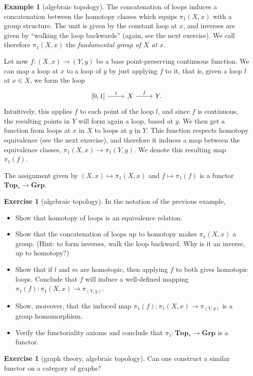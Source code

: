 \documentclass[a4paper,11pt,oneside]{scrbook}
\numberwithin{equation}{section}
\theoremstyle{plain}
\theoremstyle{definition}
\newtheorem{eg}[thm]{Example}
\newtheorem{ex}[thm]{Exercise}
\newcommand{\cat}[1]{{\mathbf{#1}}} %
\newcommand{\ar}[2][]{\arrow{#2}{#1}}
\newcommand{\Grp}{\cat{Grp}}
\DeclareMathOperator{\1}{\mathbbm{1}}
\DeclareMathOperator{\2}{\mathbbm{2}}
\let\originalleft\left
\let\originalright\right
\renewcommand{\left}{\mathopen{}\mathclose\bgroup\originalleft}
\renewcommand{\right}{\aftergroup\egroup\originalright}
\begin{document}
\begin{eg}[algebraic topology]
 The concatenation of loops induces a concatenation between the homotopy classes which equips $\pi_1(X,x)$ with a group structure. The unit is given by the constant loop at $x$, and inverses are given by ``walking the loop backwards'' (again, see the next exercise). We call therefore $\pi_1(X,x)$ the \emph{fundamental group of $X$ at $x$}. 
 
 Let now $f:(X,x)\to(Y,y)$ be a base point-preserving continuous function. We can map a loop at $x$ to a loop of $y$ by just applying $f$ to it, that is, given a loop $l$ at $x\in X$, we form the loop
 $$
 \begin{tikzcd}
  \left[0,1\right] \ar{r}{l} & X \ar{r}{f} & Y . 
 \end{tikzcd}
 $$
 Intuitively, this applies $f$ to each point of the loop $l$, and since $f$ is continuous, the resulting points in $Y$ will form again a loop, based at $y$. We then get a function from loops at $x$ in $X$ to loops at $y$ in $Y$. This function respects homotopy equivalence (see the next exercise), and therefore it induces a map between the equivalence classes, $\pi_1(X,x) \to \pi_1(Y,y)$. We denote this resulting map $\pi_1(f)$.
 
 The assignment given by $(X,x)\mapsto \pi_1(X,x)$ and $f\mapsto \pi_1(f)$ is a functor $\cat{Top_*}\to\Grp$.
\end{eg}

\begin{ex}[algebraic topology]
In the notation of the previous example,
\begin{itemize}
 \item Show that homotopy of loops is an equivalence relation.
 \item Show that the concatenation of loops up to homotopy makes $\pi_1(X,x)$ a group. (Hint: to form inverses, walk the loop backward. Why is it an inverse, up to homotopy?)
 \item Show that if $l$ and $m$ are homotopic, then applying $f$ to both gives homotopic loops. Conclude that $f$ will induce a well-defined mapping $\pi_1(f): \pi_1(X,x) \to \pi_(Y,y)$.
 \item Show, moreover, that the induced map $\pi_1(f): \pi_1(X,x) \to \pi_(Y,y)$ is a group homomorphism. 
 \item Verify the functoriality axioms and conclude that $\pi_1:\cat{Top_*}\to\Grp$ is a functor.
\end{itemize}
\end{ex}

\begin{ex}[graph theory, algebraic topology]
 Can one construct a similar functor on a category of graphs?
\end{ex}
\end{document}
